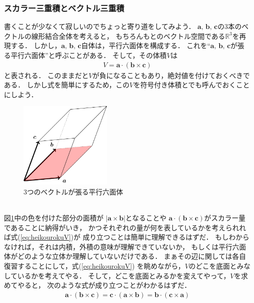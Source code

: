 \subsubsection{スカラー三重積とベクトル三重積}
書くことが少なくて寂しいのでちょっと寄り道をしてみよう．
$\bm{a}, \, \bm{b}, \, \bm{c}$の3本のベクトルの線形結合全体を考えると，
もちろんもとのベクトル空間である$\mathbb{R}^3$を再現する．
しかし，$\bm{a}, \, \bm{b}, \, \bm{c}$自体は，平行六面体を構成する．
これを``$\bm{a}, \, \bm{b}, \, \bm{c}$が張る平行六面体''と呼ぶことがある．
そして，その体積$V$は
\begin{align}
V = \bm{a} \cdot ( \bm{b} \times \bm{c} ) 
\label{eq:heikourokuV}
\end{align}
と表される．
このままだと$V$が負になることもあり，絶対値を付けておくべきである．
しかし式を簡単にするため，この$V$を符号付き体積とでも呼んでおくことにしよう．
\begin{figure}[h]
 \begin{center}
 \includegraphics[width=4.5cm]{picture/vecter21.pdf}
 \caption{3つのベクトルが張る平行六面体}
\label{fig:heikourokumentai}
 \end{center}
\end{figure}
\\
図\ref{fig:heikourokumentai}中の色を付けた部分の面積が
$ \lvert \bm{a} \times \bm{b} \rvert $となることや
$ \bm{a} \cdot ( \bm{b} \times \bm{c} )$がスカラー量であることに納得がいき，
かつそれぞれの量が何を表しているかを考えられれば式(\ref{eq:heikourokuV})が
成り立つことは簡単に理解できるはずだ．
もしわからなければ，それは内積，外積の意味が理解できていないか，
もしくは平行六面体がどのような立体か理解していないだけである．
まぁその辺に関しては各自復習することにして，式(\ref{eq:heikourokuV})
を眺めながら，$V$のどこを底面とみなしているかを考えてやる．
そして，どこを底面とみるかを変えてやって，$V$を求めてやると，
次のような式が成り立つことがわかるはずだ．
\begin{align}
\bm{a} \cdot ( \bm{b} \times \bm{c} ) = \bm{c} \cdot ( \bm{a} \times \bm{b})
= \bm{b} \cdot ( \bm{c} \times \bm{a} ) 
\label{eq:sanjuuseki}
\end{align}
